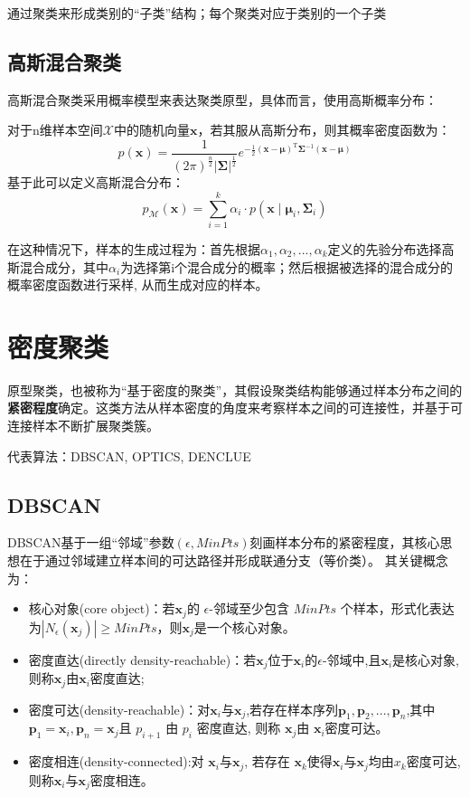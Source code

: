 通过聚类来形成类别的“子类”结构；每个聚类对应于类别的一个子类

\subsection{高斯混合聚类}
高斯混合聚类采用概率模型来表达聚类原型，具体而言，使用高斯概率分布：

对于n维样本空间$\mathcal{X}$中的随机向量$\boldsymbol x$，若其服从高斯分布，则其概率密度函数为：\[
p(\boldsymbol{x})=\frac{1}{(2 \pi)^{\frac{n}{2}}|\boldsymbol{\Sigma}|^{\frac{1}{2}}} e^{-\frac{1}{2}(\boldsymbol{x}-\boldsymbol{\mu})^{\mathrm{T}} \boldsymbol{\Sigma}^{-1}(\boldsymbol{x}-\boldsymbol{\mu})}
\]
基于此可以定义高斯混合分布：
\[
p_{\mathcal{M}}(\boldsymbol{x})=\sum_{i=1}^{k} \alpha_{i} \cdot p\left(\boldsymbol{x} \mid \boldsymbol{\mu}_{i}, \boldsymbol{\Sigma}_{i}\right)
\]

在这种情况下，样本的生成过程为：首先根据$\alpha_1, \alpha_2, ...,\alpha_k$定义的先验分布选择高斯混合成分，其中$\alpha_i$为选择第i个混合成分的概率；然后根据被选择的混合成分的概率密度函数进行采样, 从而生成对应的样本。



\section{密度聚类}\label{sec:9.5}

原型聚类，也被称为“基于密度的聚类”，其假设聚类结构能够通过样本分布之间的\textbf{紧密程度}确定。这类方法从样本密度的角度来考察样本之间的可连接性，并基于可连接样本不断扩展聚类簇。

代表算法：DBSCAN, OPTICS, DENCLUE

\subsection{DBSCAN}
DBSCAN基于一组“邻域”参数$(\epsilon, MinPts)$刻画样本分布的紧密程度，其核心思想在于通过邻域建立样本间的可达路径并形成联通分支（等价类）。
其关键概念为：
\begin{itemize}
    \item 核心对象(core object)：若$\boldsymbol x_j$的 $\epsilon$-邻域至少包含 $MinPts$ 个样本，形式化表达为$|N_\epsilon(\boldsymbol x_j)| \ge MinPts$，则$\boldsymbol x_j$是一个核心对象。
    \item 密度直达(directly density-reachable)：若$\boldsymbol x_j$位于$\boldsymbol x_i$的$\epsilon$-邻域中,且$\boldsymbol x_i$是核心对象,则称$\boldsymbol x_j$由$\boldsymbol x_i$密度直达;
    \item 密度可达(density-reachable)：对$\boldsymbol x_i$与$\boldsymbol x_j$,若存在样本序列$\boldsymbol p_1, \boldsymbol p_2,...,\boldsymbol p_n$,其中$\boldsymbol p_1 = \boldsymbol x_i, \boldsymbol p_n = \boldsymbol x_j$且 $p_{i+1}$ 由 $p_i$ 密度直达, 则称 $\boldsymbol x_j$由 $\boldsymbol x_i$密度可达。
    \item 密度相连(density-connected):对 $\boldsymbol x_i$与$\boldsymbol x_j$, 若存在 $\boldsymbol x_k$使得$\boldsymbol x_i$与$\boldsymbol x_j$均由$x_k$密度可达,则称$\boldsymbol x_i$与$\boldsymbol x_j$密度相连。
\end{itemize}

